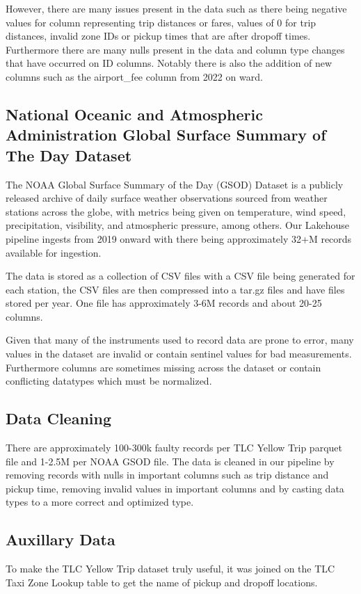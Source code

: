\documentclass[conference]{IEEEtran}
\begin{document}
However, there are many issues present in the data such as there being negative values for column representing trip distances or fares, values of 0 for trip distances, invalid zone IDs or pickup times that are after dropoff times. Furthermore there are many nulls present in the data and column type changes that have occurred on ID columns. Notably there is also the addition of new columns such as the airport\_fee column from 2022 on ward.

\subsection{National Oceanic and Atmospheric Administration Global Surface Summary of The Day Dataset\cite{noaa}}

The NOAA Global Surface Summary of the Day (GSOD) Dataset is a publicly released archive of daily surface weather observations sourced from weather stations across the globe, with metrics being given on temperature, wind speed, precipitation, visibility, and atmospheric pressure, among others. Our Lakehouse pipeline ingests from 2019 onward with there being approximately 32+M records available for ingestion.

The data is stored as a collection of CSV files with a CSV file being generated for each station, the CSV files are then compressed into a tar.gz files and have files stored per year. One file has approximately 3-6M records and about 20-25 columns.

Given that many of the instruments used to record data are prone to error, many values in the dataset are invalid or contain sentinel values for bad measurements. Furthermore columns are sometimes missing across the dataset or contain conflicting datatypes which must be normalized.

\subsection{Data Cleaning}

There are approximately 100-300k faulty records per TLC Yellow Trip parquet file and 1-2.5M per NOAA GSOD file. The data is cleaned in our pipeline by removing records with nulls in important columns such as trip distance and pickup time, removing invalid values in important columns and by casting data types to a more correct and optimized type.

\subsection{Auxillary Data}
To make the TLC Yellow Trip dataset truly useful, it was joined on the TLC Taxi Zone Lookup table to get the name of pickup and dropoff locations.
\end{document}
